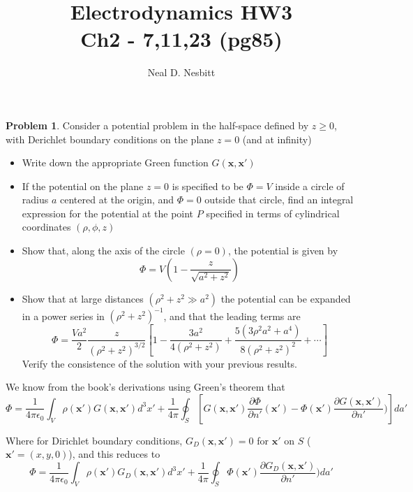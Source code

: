 \documentclass{article}
\title{Electrodynamics HW3\\
Ch2 - 7,11,23 (pg85)}
\author{Neal D. Nesbitt}
\begin{document}
\maketitle

\theoremstyle{definition}
\newtheorem{problem}{Problem}

\setcounter{problem}{6}
\begin{problem}
Consider a potential problem in the half-space defined by $z\ge 0$, with Derichlet boundary conditions on the plane $z=0$ (and at infinity)
\begin{itemize}
\item Write down the appropriate Green function $G(\mathbf{x},\mathbf{x}')$
\item If the potential on the plane $z=0$ is specified to be $\Phi=V$ inside a circle of radius $a$ centered at the origin, and $\Phi = 0$ outside that circle, find an integral expression for the potential at the point $P$ specified in terms of cylindrical coordinates $(\rho,\phi,z)$
\item Show that, along the axis of the circle $(\rho = 0)$, the potential is given by
\[ \Phi = V \left( 1 - \frac{z}{\sqrt{a^{2}+z^{2}}} \right) \]
\item Show that at large distances $(\rho^{2}+z^{2} \gg a^{2} )$ the potential can be expanded in a power series in $(\rho^{2}+z^{2})^{-1}$, and that the leading terms are
\[ \Phi = \frac{Va^{2}}{2} \frac{z}{(\rho^{2}+z^{2})^{3/2}} \left[ 1 - \frac{3a^{2}}{4(\rho^{2}+z^{2})} + \frac{5(3\rho^{2}a^{2}+a^{4})}{8(\rho^{2}+z^{2})^{2}} + \cdots \right] \]
Verify the consistence of the solution with your previous results.
\end{itemize}
\end{problem}

We know from the book's derivations using Green's theorem that
\[ \Phi = \frac{1}{4\pi\epsilon_{0}} \int_{V} \rho(\mathbf{x'}) G(\mathbf{x},\mathbf{x'}) d^{3}x' + \frac{1}{4\pi} \oint_{S} \left[ G(\mathbf{x},\mathbf{x'}) \frac{\partial\Phi}{\partial n'}(\mathbf{x'}) -\Phi(\mathbf{x'}) \frac{\partial G(\mathbf{x},\mathbf{x'})}{\partial n'}) \right] da' \]


Where for Dirichlet boundary conditions, $G_{D}(\mathbf{x},\mathbf{x'})=0$ for $\mathbf{x'}$ on $S$ ( $\mathbf{x'}=(x,y,0)$), and this reduces to
\[ \Phi = \frac{1}{4\pi\epsilon_{0}} \int_{V} \rho(\mathbf{x'}) G_{D}(\mathbf{x},\mathbf{x'}) d^{3}x' + \frac{1}{4\pi} \oint_{S} \Phi(\mathbf{x'}) \frac{\partial G_{D}(\mathbf{x},\mathbf{x'})}{\partial n'}) da' \]
\end{document}
